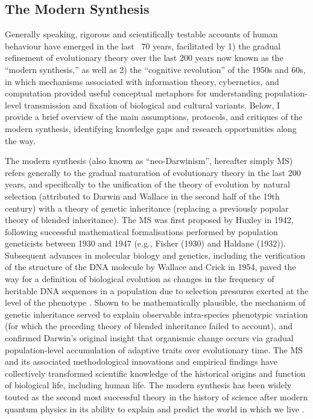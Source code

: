 \subsection{The Modern Synthesis}
Generally speaking, rigorous and scientifically testable accounts of human behaviour have emerged in the last ~70 years, facilitated by 1) the gradual refinement of evolutionary theory over the last 200 years now known as the ``modern synthesis,'' as well as 2) the ``cognitive revolution'' of the 1950s and 60s, in which mechanisms associated with information theory, cybernetics, and computation provided useful conceptual metaphors for understanding population-level transmission and fixation of biological and cultural variants. Below, I provide a brief overview of the main assumptions, protocols, and critiques of the modern synthesis, identifying knowledge gaps and research opportunities along the way.

The modern synthesis (also known as ``neo-Darwinism'', hereafter simply MS) refers generally to the gradual maturation of evolutionary theory in the last 200 years, and specifically to the unification of the theory of evolution by natural selection (attributed to Darwin and Wallace in the second half of the 19th century) with a theory of genetic inheritance (replacing a previously popular theory of blended inheritance).  The MS was first proposed by Huxley in 1942, following successful mathematical formalisations performed by population geneticists between 1930 and 1947 (e.g., Fisher (1930) and Haldane (1932)).  Subsequent advances in molecular biology and genetics, including the verification of the structure of the DNA molecule by Wallace and Crick in 1954, paved the way for a definition of biological evolution as changes in the frequency of heritable DNA sequences in a population due to selection pressures exerted at the level of the phenotype \citep{Dawkins1976,Grafen1984}.  Shown to be mathematically plausible, the mechanism of genetic inheritance served to explain observable intra-species phenotypic variation (for which the preceding theory of blended inheritance failed to account), and confirmed Darwin's original insight that organismic change occurs via gradual population-level accumulation of adaptive traits over evolutionary time. The MS and its associated methodological innovations and empirical findings have collectively transformed scientific knowledge of the historical origins and function of biological life, including human life. The modern synthesis has been widely touted as the second most successful theory in the history of science after modern quantum physics in its ability to explain and predict the world in which we live \citep{Dunbar1996}.

